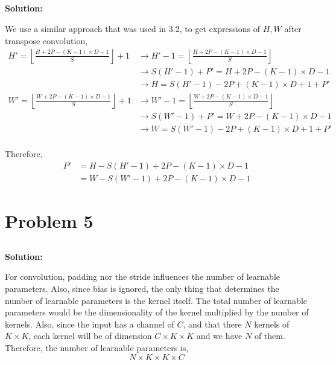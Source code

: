\documentclass{article}
\newenvironment{solution}
  {\par\noindent\textbf{Solution:}\par}
  {\par}
\begin{document}
\subsection{}
\begin{solution}
  We use a similar approach that was used in 3.2, to get expressions of $H,W$ after transpose convolution,
  \[ 
  \begin{aligned}
        H' = \left\lfloor \frac{H + 2P  - (K-1)\times D - 1}{S} \right\rfloor + 1 &\to H' - 1 = \left\lfloor \frac{H + 2P  - (K-1)\times D - 1}{S} \right\rfloor \\ 
                                                              &\to S(H'-1) + P' = H + 2P - (K-1)\times D - 1 \\ 
                                                              &\to H = S(H'-1) -2P + (K-1)\times D + 1 + P' \\ 
            W' = \left\lfloor \frac{W + 2P  - (K-1)\times D - 1}{S} \right\rfloor + 1 &\to W' - 1 = \left\lfloor \frac{W + 2P  - (K-1)\times D - 1}{S} \right\rfloor \\ 
                                                              &\to S(W'-1) + P' = W + 2P - (K-1)\times D - 1 \\ 
                                                              &\to W = S(W'-1) -2P + (K-1)\times D + 1 + P' \\ 
      \end{aligned}
    \]

  Therefore,
  \[
    \begin{aligned}
      P' &= H - S(H'-1) +2P - (K-1) \times D -1 \\ 
         &= W - S(W'-1)+2P -(K-1) \times D -1 
    \end{aligned}
  \]
\end{solution}

\section{Problem 5}
\subsection{}
\begin{solution}
  For convolution, padding nor the stride influences the number of learnable parameters. Also, since bias is ignored, the only thing that determines the number of learnable parameters 
  is the kernel itself. The total number of learnable parameters would be the dimensionality of the kernel multiplied by the number of kernels. 
  Also, since the input has a channel of $C$,  and that there $N$ kernels of $K \times K$, each kernel will be of dimension $C \times K \times K$ and we have $N$ of them. 
  Therefore, the number of learnable parameters is,
  \[
    N \times K \times K \times C
  \]
\end{solution}
\end{document}
